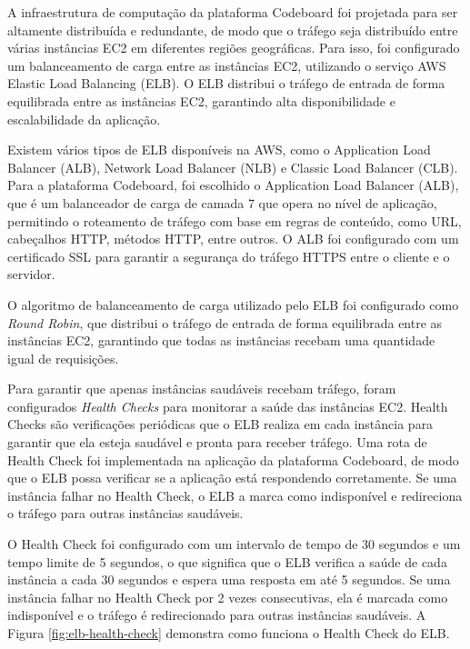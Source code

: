 A infraestrutura de computação da plataforma Codeboard foi projetada para ser altamente distribuída e redundante, de modo que o tráfego seja distribuído entre várias instâncias EC2 em diferentes regiões geográficas. Para isso, foi configurado um balanceamento de carga entre as instâncias EC2, utilizando o serviço AWS Elastic Load Balancing (ELB). O ELB distribui o tráfego de entrada de forma equilibrada entre as instâncias EC2, garantindo alta disponibilidade e escalabilidade da aplicação.

Existem vários tipos de ELB disponíveis na AWS, como o Application Load Balancer (ALB), Network Load Balancer (NLB) e Classic Load Balancer (CLB). Para a plataforma Codeboard, foi escolhido o Application Load Balancer (ALB), que é um balanceador de carga de camada 7 que opera no nível de aplicação, permitindo o roteamento de tráfego com base em regras de conteúdo, como URL, cabeçalhos HTTP, métodos HTTP, entre outros. O ALB foi configurado com um certificado SSL para garantir a segurança do tráfego HTTPS entre o cliente e o servidor.

O algoritmo de balanceamento de carga utilizado pelo ELB foi configurado como \emph{Round Robin}, que distribui o tráfego de entrada de forma equilibrada entre as instâncias EC2, garantindo que todas as instâncias recebam uma quantidade igual de requisições. 

Para garantir que apenas instâncias saudáveis recebam tráfego, foram configurados \emph{Health Checks} para monitorar a saúde das instâncias EC2. Health Checks são verificações periódicas que o ELB realiza em cada instância para garantir que ela esteja saudável e pronta para receber tráfego. Uma rota de Health Check foi implementada na aplicação da plataforma Codeboard, de modo que o ELB possa verificar se a aplicação está respondendo corretamente. Se uma instância falhar no Health Check, o ELB a marca como indisponível e redireciona o tráfego para outras instâncias saudáveis. 

O Health Check foi configurado com um intervalo de tempo de 30 segundos e um tempo limite de 5 segundos, o que significa que o ELB verifica a saúde de cada instância a cada 30 segundos e espera uma resposta em até 5 segundos. Se uma instância falhar no Health Check por 2 vezes consecutivas, ela é marcada como indisponível e o tráfego é redirecionado para outras instâncias saudáveis. A Figura \ref{fig:elb-health-check} demonstra como funciona o Health Check do ELB.

